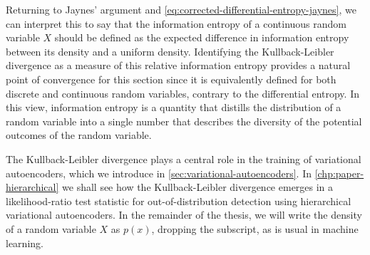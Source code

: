 Returning to Jaynes' argument and \cref{eq:corrected-differential-entropy-jaynes}, we can interpret this to say that the information entropy of a continuous random variable $X$ should be defined as the expected difference in information entropy between its density and a uniform density. 
Identifying the Kullback-Leibler divergence as a measure of this relative information entropy provides a natural point of convergence for this section since it is equivalently defined for both discrete and continuous random variables, contrary to the differential entropy. 
In this view, information entropy is a quantity that distills the distribution of a random variable into a single number that describes the diversity of the potential outcomes of the random variable.

The Kullback-Leibler divergence plays a central role in the training of variational autoencoders, which we introduce in \cref{sec:variational-autoencoders}. In \cref{chp:paper-hierarchical} we shall see how the Kullback-Leibler divergence emerges in a likelihood-ratio test statistic for out-of-distribution detection using hierarchical variational autoencoders. 
In the remainder of the thesis, we will write the density of a random variable $X$ as $p(x)$, dropping the subscript, as is usual in machine learning. 




